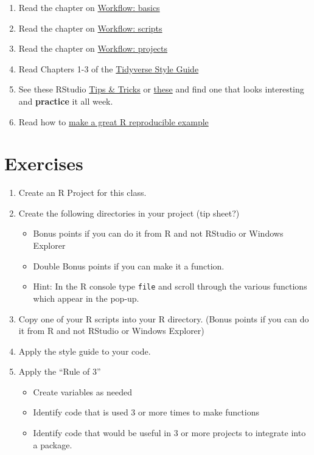 \documentclass[]{book}
\providecommand{\tightlist}{%
  \setlength{\itemsep}{0pt}\setlength{\parskip}{0pt}}
\begin{document}
\begin{enumerate}
\def\labelenumi{\arabic{enumi}.}
\tightlist
\item
  Read the chapter on
  \href{http://r4ds.had.co.nz/workflow-basics.html}{Workflow: basics}
\item
  Read the chapter on
  \href{http://r4ds.had.co.nz/workflow-scripts.html}{Workflow: scripts}
\item
  Read the chapter on
  \href{http://r4ds.had.co.nz/workflow-projects.html}{Workflow:
  projects}
\item
  Read Chapters 1-3 of the
  \href{http://style.tidyverse.org/index.html}{Tidyverse Style Guide}
\item
  See these RStudio
  \href{https://rviews.rstudio.com/categories/tips-and-tricks/}{Tips \&
  Tricks} or \href{https://twitter.com/rstudiotips}{these} and find one
  that looks interesting and \textbf{practice} it all week.
\item
  Read how to
  \href{https://stackoverflow.com/questions/5963269/how-to-make-a-great-r-reproducible-example}{make
  a great R reproducible example}
\end{enumerate}

\section{Exercises}\label{exercises}

\begin{enumerate}
\def\labelenumi{\arabic{enumi}.}
\tightlist
\item
  Create an R Project for this class.
\item
  Create the following directories in your project (tip sheet?)

  \begin{itemize}
  \tightlist
  \item
    Bonus points if you can do it from R and not RStudio or Windows
    Explorer
  \item
    Double Bonus points if you can make it a function.
  \item
    Hint: In the R console type \texttt{file} and scroll through the
    various functions which appear in the pop-up.
  \end{itemize}
\item
  Copy one of your R scripts into your R directory. (Bonus points if you
  can do it from R and not RStudio or Windows Explorer)
\item
  Apply the style guide to your code.\\
\item
  Apply the ``Rule of 3''

  \begin{itemize}
  \tightlist
  \item
    Create variables as needed
  \item
    Identify code that is used 3 or more times to make functions
  \item
    Identify code that would be useful in 3 or more projects to
    integrate into a package.
  \end{itemize}
\end{enumerate}
\end{document}
